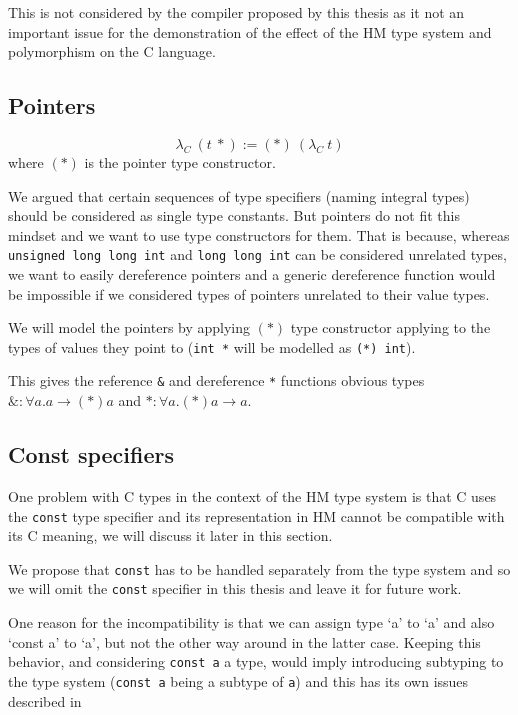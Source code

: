This is not considered by the compiler proposed by this thesis as it not an important issue for the demonstration of the effect of the HM type system and polymorphism on the C language. %

\subsection{Pointers}

\begin{defn}
	$$\lambda_C\ (t\ *) := (*)\ (\lambda_C\ t)$$
	where $(*)$ is the pointer type constructor.
\end{defn}

We argued that certain sequences of type specifiers (naming integral types) should be considered as single type constants. But pointers do not fit this mindset and we want to use type constructors for them. That is because, whereas \lstinline{unsigned long long int} and \lstinline{long long int} can be considered unrelated types, we want to easily dereference pointers and a generic dereference function would be impossible if we considered types of pointers unrelated to their value types.

We will model the pointers by applying $(*)$ type constructor applying to the types of values they point to (\lstinline{int *} will be modelled as \lstinline{(*) int}).

This gives the reference \lstinline{&} and dereference \lstinline{*} functions obvious types $\&: \forall a . a \rightarrow (*) a$ and $*: \forall a . (*) a \rightarrow a$.

\subsection{Const specifiers}

One problem with C types in the context of the HM type system is that C uses the \lstinline{const} type specifier and its representation in HM cannot be compatible with its C meaning, we will discuss it later in this section.

We propose that \lstinline{const} has to be handled separately from the type system and so we will omit the \lstinline{const} specifier in this thesis and leave it for future work.

One reason for the incompatibility is that we can assign type `a' to `a' and also `const a' to `a', but not the other way around in the latter case. Keeping this behavior, and considering \lstinline{const a} a type, would imply introducing subtyping to the type system (\lstinline{const a} being a subtype of \lstinline{a}) and this has its own issues described in %

